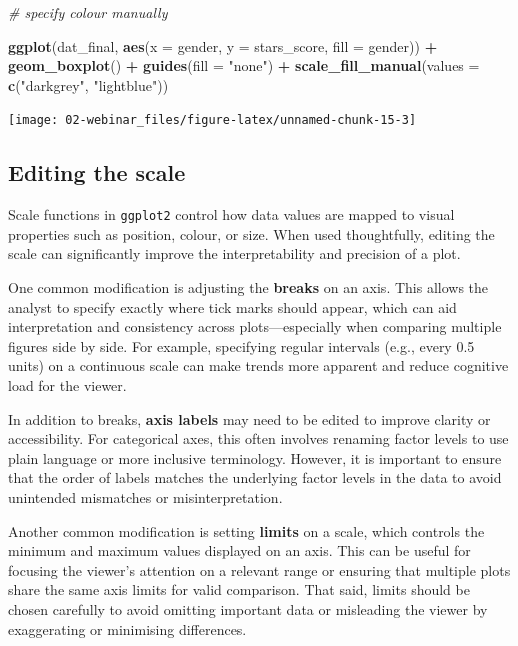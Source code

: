 \documentclass[
  oneside]{book}
\newenvironment{Shaded}{\begin{snugshade}}{\end{snugshade}}
\newcommand{\AttributeTok}[1]{\textcolor[rgb]{0.13,0.29,0.53}{#1}}
\newcommand{\CommentTok}[1]{\textcolor[rgb]{0.56,0.35,0.01}{\textit{#1}}}
\newcommand{\FunctionTok}[1]{\textcolor[rgb]{0.13,0.29,0.53}{\textbf{#1}}}
\newcommand{\NormalTok}[1]{#1}
\newcommand{\SpecialCharTok}[1]{\textcolor[rgb]{0.81,0.36,0.00}{\textbf{#1}}}
\newcommand{\StringTok}[1]{\textcolor[rgb]{0.31,0.60,0.02}{#1}}
\begin{document}
\begin{Shaded}
\begin{Highlighting}[]
\CommentTok{\# specify colour manually}

\FunctionTok{ggplot}\NormalTok{(dat\_final, }\FunctionTok{aes}\NormalTok{(}\AttributeTok{x =}\NormalTok{ gender, }\AttributeTok{y =}\NormalTok{ stars\_score, }\AttributeTok{fill =}\NormalTok{ gender)) }\SpecialCharTok{+}
  \FunctionTok{geom\_boxplot}\NormalTok{() }\SpecialCharTok{+}
  \FunctionTok{guides}\NormalTok{(}\AttributeTok{fill =} \StringTok{"none"}\NormalTok{) }\SpecialCharTok{+}
  \FunctionTok{scale\_fill\_manual}\NormalTok{(}\AttributeTok{values =} \FunctionTok{c}\NormalTok{(}\StringTok{"darkgrey"}\NormalTok{, }\StringTok{"lightblue"}\NormalTok{))}
\end{Highlighting}
\end{Shaded}

\begin{center}\texttt{[image: 02-webinar\_files/figure-latex/unnamed-chunk-15-3]} \end{center}

\subsection{Editing the scale}\label{editing-the-scale}

Scale functions in \texttt{ggplot2} control how data values are mapped to visual properties such as position, colour, or size. When used thoughtfully, editing the scale can significantly improve the interpretability and precision of a plot.

One common modification is adjusting the \textbf{breaks} on an axis. This allows the analyst to specify exactly where tick marks should appear, which can aid interpretation and consistency across plots---especially when comparing multiple figures side by side. For example, specifying regular intervals (e.g., every 0.5 units) on a continuous scale can make trends more apparent and reduce cognitive load for the viewer.

In addition to breaks, \textbf{axis labels} may need to be edited to improve clarity or accessibility. For categorical axes, this often involves renaming factor levels to use plain language or more inclusive terminology. However, it is important to ensure that the order of labels matches the underlying factor levels in the data to avoid unintended mismatches or misinterpretation.

Another common modification is setting \textbf{limits} on a scale, which controls the minimum and maximum values displayed on an axis. This can be useful for focusing the viewer's attention on a relevant range or ensuring that multiple plots share the same axis limits for valid comparison. That said, limits should be chosen carefully to avoid omitting important data or misleading the viewer by exaggerating or minimising differences.
\end{document}

